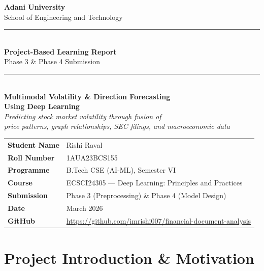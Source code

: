 \documentclass[12pt,a4paper]{article}
\begin{document}
\begin{titlepage}
\centering
\vspace*{1.5cm}
{\Large \textbf{Adani University}\\[0.3cm]
\large School of Engineering and Technology}\\[1cm]
\rule{\linewidth}{1pt}\\[0.5cm]
{\LARGE \textbf{Project-Based Learning Report}}\\[0.3cm]
{\large Phase 3 \& Phase 4 Submission}\\[0.3cm]
\rule{\linewidth}{1pt}\\[1cm]

{\Large \textbf{Multimodal Volatility \& Direction Forecasting\\
Using Deep Learning}}\\[0.5cm]

{\large \textit{Predicting stock market volatility through fusion of\\
price patterns, graph relationships, SEC filings, and macroeconomic data}}\\[1.5cm]

\begin{tabular}{ll}
\textbf{Student Name}   & Rishi Raval \\[0.3cm]
\textbf{Roll Number}    & 1AUA23BCS155 \\[0.3cm]
\textbf{Programme}      & B.Tech CSE (AI-ML), Semester VI \\[0.3cm]
\textbf{Course}         & ECSCI24305 --- Deep Learning: Principles and Practices \\[0.3cm]
\textbf{Submission}     & Phase 3 (Preprocessing) \& Phase 4 (Model Design) \\[0.3cm]
\textbf{Date}           & March 2026 \\[0.3cm]
\textbf{GitHub}         & \url{https://github.com/imrishi007/financial-document-analysis}
\end{tabular}

\vfill
\end{titlepage}

\tableofcontents
\newpage

\section{Project Introduction \& Motivation}
\end{document}

